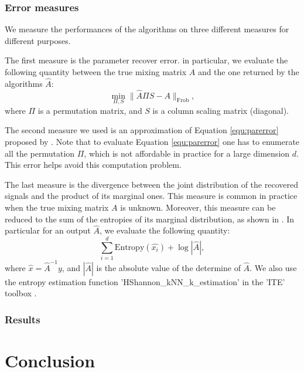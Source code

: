 \documentclass[twoside]{article}
\theoremstyle{definition}
\begin{document}
\subsubsection{Error measures}
We measure the performances of the algorithms on three different measures for different purposes.

The first measure is the parameter recover error. in particular, we evaluate the following quantity between the true mixing matrix $A$ and the one returned by the algorithms $\widehat{A}$:
\begin{equation}
\label{equ:parerror}
\min_{\Pi,S} \|\widehat{A}\Pi S - A\|_{\text{Frob}},
\end{equation}
where $\Pi$ is a permutation matrix, and $S$ is a column scaling matrix (diagonal).

The second measure we used is an approximation of Equation \eqref{equ:parerror} proposed by \citet{comon1994independent}. 
Note that to evaluate Equation \eqref{equ:parerror} one has to enumerate all the permutation $\Pi$, which is not affordable in practice for a large dimension $d$. 
This error helps avoid this computation problem. 

The last measure is the divergence between the joint distribution of the recovered signals and the product of its marginal ones. 
This measure is common in practice when the true mixing matrix $A$ is unknown. 
Moreover, this measure can be reduced to the sum of the entropies of its marginal distribution, as shown in \cite{Learned-Miller:2003:IUS:945365.964306}. 
In particular for an output $\widehat{A}$, we evaluate the following quantity:
\begin{equation}
\sum_{i = 1}^{d} \text{Entropy}(\widehat{x_i}) + \log |\widehat{A}|,
\end{equation}
where $\widehat{x} = \widehat{A}^{-1}y$, and $|\widehat{A}|$ is the absolute value of the determine of $\widehat{A}$. We also use the entropy estimation function 'HShannon\_kNN\_k\_estimation' in the 'ITE' toolbox \cite{szabo14information}.

\subsubsection{Results}


\section{Conclusion}
\end{document}
